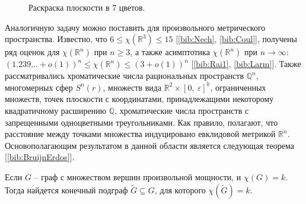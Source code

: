 \begin{figure}[h]
\centering
\captionsetup{justification=centering}
\caption{Раскраска плоскости в 7 цветов.}
\label{introduction:fig:plane}
\end{figure}

Аналогичную задачу можно поставить для произвольного метрического пространства. Известно, что 
$6 \leq \chi(\mathbb{R}^3) \leq 15$ [\ref{bib:Nech}, \ref{bib:Coul}], 
получены ряд оценок для $\chi(\mathbb{R}^n)$ при $n \ge 3$, а также асимптотика $\chi(\mathbb{R}^n)$ при $n\to\infty$: 
$(1.239...+o(1))^n\leq \chi(\mathbb{R}^n)\leq (3+o(1))^n$ [\ref{bib:Rai1}, \ref{bib:Larm}].
Также рассматривались хроматические числа рациональных пространств $\mathbb{Q}^n$, многомерных сфер $S^n(r)$, 
множеств вида $\mathbb{R}^2 \times \left[ 0,~\varepsilon \right]^{k}$, ограниченных множеств, точек плоскости с координатами, принадлежащими некоторому квадратичному расширению $\mathbb{Q}$, хроматические числа пространств с запрещенными одноцветными треугольниками. Как правило, полагают, что расстояние между точками множества индуцировано евклидовой метрикой $\mathbb{R}^n$. Основополагающим результатом в данной области является следующая теорема [\ref{bib:BruijnErdos}].

\begin{theorem1}
Если $G$ -- граф с множеством вершин произвольной мощности, и $\chi(G) = k$. Тогда найдется конечный подграф  $\widetilde{G} \subseteq G$, для которого $\chi(\widetilde{G}) = k$. 
\end{theorem1}

